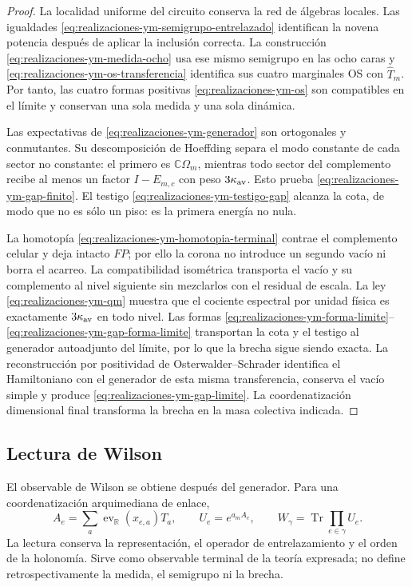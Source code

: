\begin{proof}
La localidad uniforme del circuito conserva la red de álgebras locales. Las
igualdades \eqref{eq:realizaciones-ym-semigrupo-entrelazado} identifican la
novena potencia después de aplicar la inclusión correcta. La construcción
\eqref{eq:realizaciones-ym-medida-ocho} usa ese mismo semigrupo en las ocho
caras y \eqref{eq:realizaciones-ym-os-transferencia} identifica sus cuatro
marginales OS con \(\widehat T_m\). Por tanto, las cuatro formas positivas
\eqref{eq:realizaciones-ym-os} son compatibles en el límite y conservan una
sola medida y una sola dinámica.

Las expectativas de \eqref{eq:realizaciones-ym-generador} son ortogonales y
conmutantes. Su descomposición de Hoeffding separa el modo constante de cada
sector no constante: el primero es \(\mathbb C\Omega_m\), mientras todo
sector del complemento recibe al menos un factor \(I-E_{m,c}\) con peso
\(3\kappa_{\rm av}\). Esto prueba
\eqref{eq:realizaciones-ym-gap-finito}. El testigo
\eqref{eq:realizaciones-ym-testigo-gap} alcanza la cota, de modo que no es
sólo un piso: es la primera energía no nula.

La homotopía \eqref{eq:realizaciones-ym-homotopia-terminal} contrae el
complemento celular y deja intacto \(FP\); por ello la corona no introduce un
segundo vacío ni borra el acarreo. La compatibilidad isométrica transporta el
vacío y su complemento al nivel siguiente sin mezclarlos con el residual de
escala. La ley
\eqref{eq:realizaciones-ym-qm} muestra que el cociente espectral por unidad
física es exactamente \(3\kappa_{\rm av}\) en todo nivel. Las formas
\eqref{eq:realizaciones-ym-forma-limite}--
\eqref{eq:realizaciones-ym-gap-forma-limite} transportan la cota y el testigo
al generador autoadjunto del límite, por lo que la brecha sigue siendo exacta.
La reconstrucción por positividad de
Osterwalder--Schrader identifica el Hamiltoniano con el generador de esta
misma transferencia, conserva el vacío simple y produce
\eqref{eq:realizaciones-ym-gap-limite}. La coordenatización dimensional final transforma
la brecha en la masa colectiva indicada.
\end{proof}



\subsection*{Lectura de Wilson}

El observable de Wilson se obtiene después del generador. Para una coordenatización
arquimediana de enlace,
\begin{equation}\label{eq:realizaciones-ym-wilson}
 A_e=\sum_a\operatorname{ev}_{\mathbb R}(x_{e,a})T_a,
 \qquad
 U_e=e^{a_mA_e},
 \qquad
 W_\gamma=\operatorname{Tr}\!\prod_{e\in\gamma}U_e.
\end{equation}
La lectura conserva la representación, el operador de entrelazamiento y el
orden de la holonomía. Sirve como observable terminal de la teoría expresada; no define
retrospectivamente la medida, el semigrupo ni la brecha.


